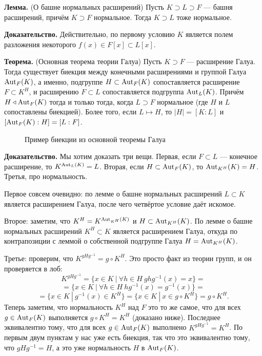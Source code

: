\QED

\textbf{Лемма.} (О башне нормальных расширений) Пусть $K \supset L \supset F$ --- башня расширений, причём $K \supset F$ нормальное.
Тогда $K \supset L$ тоже нормальное.

\textbf{Доказательство.} Действительно, по первому условию $K$ является полем разложения некоторого $f(x) \in F[x] \subset L[x]$.

\QED

\textbf{Теорема.} (Основная теорема теории Галуа) Пусть $K \supset F$ --- расширение Галуа.
Тогда существует биекция между конечными расширениями и группой Галуа $\operatorname{Aut}_F(K)$, а именно, подгруппе $H \subset \operatorname{Aut}_F(K)$ сопоставляется расширение $F \subset K^H$, и расширению $F \subset L$ сопоставляется подгруппа $\operatorname{Aut}_L(K)$.
Причём $H \triangleleft \operatorname{Aut}_F(K)$ тогда и только тогда, когда $L \supset F$ нормальное (где $H$ и $L$ сопоставлены биекцией).
Более того, если $L \mapsto H$, то $|H| = [K : L]$ и $[\operatorname{Aut}_F(K) : H] = [L : F]$.

\begin{figure}[ht]
    \centering
    \caption{Пример биекции из основной теоремы Галуа}
\end{figure}

\textbf{Доказательство.} Мы хотим доказать три вещи. Первая, если $F \subset L$ --- конечное расширение, то $K^{\operatorname{Aut}_L(K)} = L$.
Вторая, если $H \subset \operatorname{Aut}_F(K)$, то $\operatorname{Aut}_{K^H}(K) = H$.
Третья, про нормальность.

Первое совсем очевидно: по лемме о башне нормальных расширений $L \subset K$ является расширением Галуа, после чего четвёртое условие даёт искомое.

Второе: заметим, что $K^H = K^{\operatorname{Aut}_{K^H}(K)}$ и $H \subset \operatorname{Aut}_{K^H}(K)$.
По лемме о башне нормальных расширений $K^H \subset K$ является расширением Галуа, откуда по контрапозиции с леммой о собственной подгруппе Галуа $H = \operatorname{Aut}_{K^H}(K)$.

Третье: проверим, что $K^{g H g^{-1}} = g \circ K^H$. Это просто факт из теории групп, и он проверяется в лоб:
\[
    K^{gHg^{-1}} = \{x \in K~|~\forall h \in H~ghg^{-1}(x) = x\} = 
\]
\[
    = \{x \in K~|~\forall h \in H~hg^{-1}(x) = g^{-1}(x)\} =
\]
\[
    = \{x \in K~|~g^{-1}(x) \in K^H\} = \{x \in K~|~x \in g \circ K^H\} = g \circ K^H.
\]
Теперь заметим, что нормальность $K^H$ над $F$ это то же самое, что для всех $g \in \operatorname{Aut}_F(K)$ выполняется $g \circ K^H = K^H$ (доказано ниже).
Последнее эквивалентно тому, что для всех $g \in \operatorname{Aut}_F(K)$ выполнено $K^{gHg^{-1}} = K^H$.
По первым двум пунктам у нас уже есть биекция, так что это эквивалентно тому, что $gHg^{-1} = H$, а это уже нормальность $H$ в $\operatorname{Aut}_{F}(K)$.

